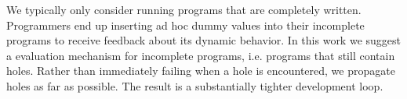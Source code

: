 We typically only consider running programs that are completely written. Programmers end up inserting ad hoc dummy values into
their incomplete programs to receive feedback about its dynamic behavior. In 
this work we suggest a evaluation mechanism for incomplete programs, i.e. programs that still contain holes. Rather than immediately failing when a hole is encountered, we propagate holes as far as possible. The result is a substantially tighter development loop. 

